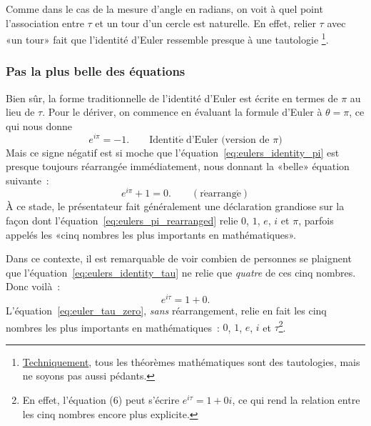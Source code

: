 Comme dans le cas de la mesure d'angle en radians, on voit à quel point
l'association entre $\tau$ et un tour d'un cercle est naturelle. En effet,
relier $\tau$ avec «\ns un tour\ns » fait que l'identité d'Euler
ressemble presque à une
tautologie\ns
\footnote{\href{https://translate.google.com/translate?hl=en&sl=en&tl=fr&u=https://www.explainxkcd.com/wiki/index.php/1475:_Technically}{Techniquement},
tous les
théorèmes mathématiques sont des tautologies, mais ne soyons pas aussi
pédants.}.

    \subsubsection{Pas la plus belle des équations} %
    \label{sec:not_the_most_beautiful_equation}

Bien sûr, la forme traditionnelle de l'identité d'Euler est écrite en termes de
$\pi$ au lieu de $\tau$. Pour le dériver, on commence en évaluant la formule
d'Euler à $\theta = \pi$, ce qui nous donne
\begin{equation}
\label{eq:eulers_identity_pi}
e^{i\pi} = -1. \qquad\mathrm{Identit\acute{e}}\; \mbox{d'Euler (version de $\pi$)}
\end{equation}
\noindent Mais ce signe négatif est si moche que
l'équation~\eqref{eq:eulers_identity_pi} est presque toujours réarrangée
immédiatement, nous donnant la «\ns belle\ns » équation suivante~:
\begin{equation}
\label{eq:eulers_pi_rearranged}
e^{i\pi} + 1 = 0. \qquad\mathrm{(r\acute{e}arrang\acute{e})}
\end{equation}
À ce stade, le présentateur fait généralement une déclaration grandiose sur la façon
dont l'équation~\eqref{eq:eulers_pi_rearranged} relie $0$, $1$, $e$, $i$ et
$\pi$, parfois appelés les «\ns cinq nombres les plus importants en
mathématiques\ns ».

Dans ce contexte, il est remarquable de voir combien de personnes se plaignent
que l'équation~\eqref{eq:eulers_identity_tau} ne relie que \emph{quatre} de ces
cinq nombres. Donc voilà~:
\begin{equation}
\label{eq:euler_tau_zero}
e^{i\tau} = 1 + 0.
\end{equation}
L'équation~\eqref{eq:euler_tau_zero}, \emph{sans} réarrangement, relie en fait
les cinq nombres les plus importants en mathématiques~: $0$, $1$, $e$, $i$ et
$\tau$\ns\footnote{En effet, l'équation (6) peut s'écrire $e^{i\tau} = 1 + 0i$,
ce qui rend la relation entre les cinq nombres encore plus explicite.}.

